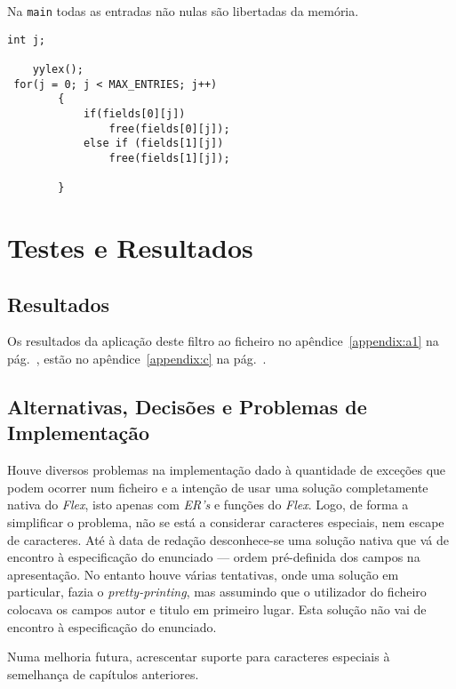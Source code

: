 Na \texttt{main} todas as entradas não nulas são libertadas da memória. 
\begin{verbatim}
int j;

    yylex();
 for(j = 0; j < MAX_ENTRIES; j++)
        {
            if(fields[0][j])
                free(fields[0][j]);
            else if (fields[1][j])
                free(fields[1][j]);

        }

\end{verbatim}

\section{Testes e Resultados}
\label{sec:ts:b2}

\subsection{Resultados}

Os resultados da aplicação deste filtro ao ficheiro no
apêndice~\ref{appendix:a1} na pág.~\pageref{appendix:a1}, estão no
apêndice~\ref{appendix:c} na pág.~\pageref{appendix:c}. 

\subsection{Alternativas, Decisões e Problemas de Implementação}

Houve diversos problemas na implementação dado à quantidade de exceções que
podem ocorrer num ficheiro  e a intenção de usar uma solução
completamente nativa do \emph{Flex}, isto apenas com \emph{ER's} e funções do
\emph{Flex}. Logo, de forma a simplificar o problema, não se está a considerar
caracteres especiais, nem escape de caracteres. Até à data de redação
desconhece-se uma solução nativa que vá de encontro à especificação do enunciado
--- ordem pré-definida dos campos na apresentação. No entanto houve várias
tentativas, onde uma solução em particular, fazia o \emph{pretty-printing}, mas
assumindo que o utilizador do ficheiro  colocava os campos
autor e titulo em primeiro lugar. Esta solução não vai de encontro
à especificação do enunciado.

Numa melhoria futura, acrescentar suporte para caracteres especiais à semelhança
de capítulos anteriores.

